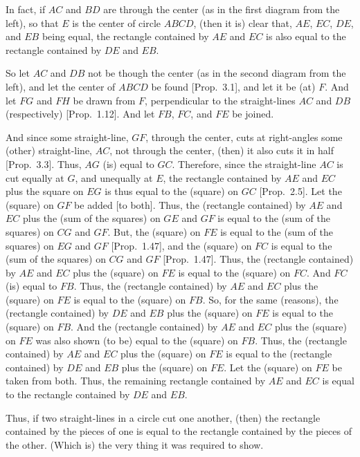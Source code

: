 \begin{Parallel}{}{}
{In fact, if $AC$ and $BD$ are through the center (as in the first diagram from the left), so that $E$ is the center
of circle $ABCD$, (then it is) clear that, $AE$, $EC$, $DE$, and $EB$ being equal,
the rectangle contained by $AE$ and $EC$ is also equal to the rectangle
contained by $DE$ and $EB$.

So let $AC$ and $DB$ not be though the center (as in the second diagram from the left), and let the center of $ABCD$ 
be found [Prop.~3.1], and let it be (at) $F$. And let $FG$ and $FH$
be drawn from $F$, perpendicular to the straight-lines $AC$ and $DB$
(respectively) [Prop.~1.12]. And let $FB$, $FC$, and $FE$ 
be joined.

And since some straight-line, $GF$, through the center, cuts at right-angles  some (other) straight-line, $AC$, not through the center,  (then) it also cuts
it in half [Prop.~3.3]. Thus, $AG$ (is) equal to $GC$. Therefore,
since the straight-line $AC$ is cut equally at $G$, and unequally at $E$,
the rectangle contained by $AE$ and $EC$ plus the square on $EG$ is thus
equal to the (square) on $GC$ [Prop.~2.5]. Let the (square) on
$GF$ be added [to both]. Thus, the (rectangle contained) by 
$AE$ and $EC$ plus the (sum of the squares) on $GE$ and $GF$ is equal to
the (sum of the squares) on $CG$ and $GF$. But, the (square) on $FE$ is equal to the (sum of the squares)
on $EG$ and $GF$   [Prop.~1.47],
and the (square)
on $FC$  is equal to the (sum of the squares) on $CG$ and $GF$ [Prop.~1.47]. Thus, the (rectangle contained) by
$AE$ and $EC$ plus the (square) on $FE$ is equal to the (square) on $FC$.
And $FC$ (is) equal to $FB$. Thus, the (rectangle contained) by
$AE$ and $EC$ plus the (square) on $FE$ is equal to the (square) on $FB$.
So, for the same (reasons), the (rectangle contained) by
$DE$ and $EB$ plus the (square) on $FE$ is equal to the (square) on $FB$.
And the (rectangle contained) by
$AE$ and $EC$ plus the (square) on $FE$ was also shown (to be) equal to the (square) on $FB$. Thus,  the (rectangle contained) by
$AE$ and $EC$ plus the (square) on $FE$ is equal to the (rectangle contained) by
$DE$ and $EB$ plus the (square) on $FE$. Let the (square) on $FE$ be
taken from both. Thus, the remaining rectangle contained by $AE$ and
$EC$ is equal to the rectangle contained by $DE$ and $EB$.

\epsfysize=1.5in
\centerline{}

Thus, if two straight-lines in a circle cut one another, (then) the rectangle
contained by the pieces of one is equal to the rectangle contained
by the pieces of the other. (Which is) the very thing it was required to
show.}
\end{Parallel}


